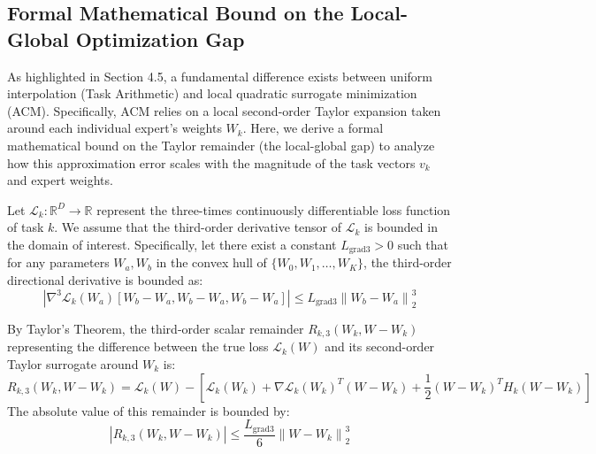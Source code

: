 \subsection{Formal Mathematical Bound on the Local-Global Optimization Gap}
As highlighted in Section 4.5, a fundamental difference exists between uniform interpolation (Task Arithmetic) and local quadratic surrogate minimization (ACM). Specifically, ACM relies on a local second-order Taylor expansion taken around each individual expert's weights $W_k$. Here, we derive a formal mathematical bound on the Taylor remainder (the local-global gap) to analyze how this approximation error scales with the magnitude of the task vectors $v_k$ and expert weights.

Let $\mathcal{L}_k : \mathbb{R}^D \to \mathbb{R}$ represent the three-times continuously differentiable loss function of task $k$. We assume that the third-order derivative tensor of $\mathcal{L}_k$ is bounded in the domain of interest. Specifically, let there exist a constant $L_{\text{grad3}} > 0$ such that for any parameters $W_a, W_b$ in the convex hull of $\{W_0, W_1, \dots, W_K\}$, the third-order directional derivative is bounded as:
\begin{equation}
    \left| \nabla^3 \mathcal{L}_k(W_a) [W_b - W_a, W_b - W_a, W_b - W_a] \right| \le L_{\text{grad3}} \left\| W_b - W_a \right\|_2^3
\end{equation}

By Taylor's Theorem, the third-order scalar remainder $R_{k,3}(W_k, W - W_k)$ representing the difference between the true loss $\mathcal{L}_k(W)$ and its second-order Taylor surrogate around $W_k$ is:
\begin{equation}
    R_{k,3}(W_k, W - W_k) = \mathcal{L}_k(W) - \left[ \mathcal{L}_k(W_k) + \nabla \mathcal{L}_k(W_k)^T (W - W_k) + \frac{1}{2} (W - W_k)^T H_k (W - W_k) \right]
\end{equation}
The absolute value of this remainder is bounded by:
\begin{equation}
    \left| R_{k,3}(W_k, W - W_k) \right| \le \frac{L_{\text{grad3}}}{6} \left\| W - W_k \right\|_2^3
\end{equation}

